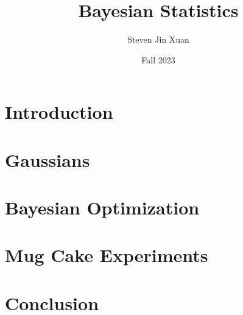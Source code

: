 \documentclass{article}[12, letterpaper]
\author{Steven Jin Xuan}
\date{Fall 2023}
\title{Bayesian Statistics}
\begin{document}

\section{Introduction}

\section{Gaussians}



\section{Bayesian Optimization}


\section{Mug Cake Experiments}

\section{Conclusion}

\pagebreak
{}

\end{document}
